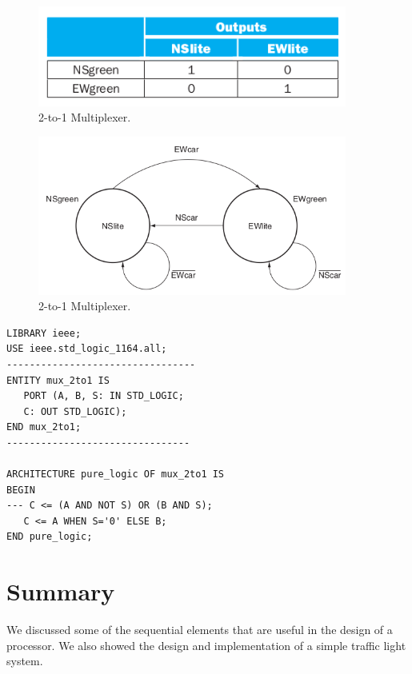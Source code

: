 \documentclass[a4paper, 11pt,oneside]{article}
\begin{document}
\begin{figure}[H]
	\begin{center}
	\includegraphics[width=4in]{fsm2.png}
	\caption{2-to-1 Multiplexer.}
	\label{fig:mux} 
	\end{center}
\end{figure}

\begin{figure}[H]
	\begin{center}
	\includegraphics[width=4in]{fsm3.png}
	\caption{2-to-1 Multiplexer.}
	\label{fig:mux} 
	\end{center}
\end{figure}



\begin{verbatim}
LIBRARY ieee;
USE ieee.std_logic_1164.all;
---------------------------------
ENTITY mux_2to1 IS
   PORT (A, B, S: IN STD_LOGIC;
   C: OUT STD_LOGIC);
END mux_2to1;
--------------------------------

ARCHITECTURE pure_logic OF mux_2to1 IS
BEGIN
--- C <= (A AND NOT S) OR (B AND S);                       
   C <= A WHEN S='0' ELSE B;
END pure_logic;
\end{verbatim}





\section{Summary}
We discussed some of the sequential elements that are useful in the design of a processor. We also showed the design and implementation of a simple traffic light system.
\end{document}
